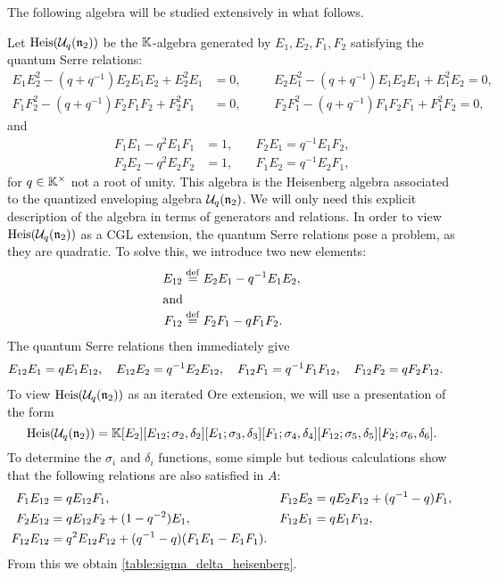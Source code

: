 The following algebra will be studied extensively in what follows.
\begin{example}\label{exmp:heisenberg}
	Let $\operatorname{Heis}(\mathcal{U}_q(\mathfrak{n}_2))$ be the $\mathbb{K}$-algebra generated by $E_1, E_2, F_1, F_2$ satisfying the quantum Serre relations:
	\begin{align*}
		E_1 E_2^2 - (q + q^{-1}) E_2 E_1 E_2 + E_2^2 E_1 & = 0,\quad &  & E_2 E_1^2 - (q + q^{-1}) E_1 E_2 E_1 + E_1^2 E_2 = 0, \\
		F_1 F_2^2 - (q + q^{-1}) F_2 F_1 F_2 + F_2^2 F_1 & = 0,\quad &  & F_2 F_1^2 - (q + q^{-1}) F_1 F_2 F_1 + F_1^2 F_2 = 0,
	\end{align*}
	and
	\begin{align*}
		F_1 E_1 - q^2 E_1 F_1 & = 1, \quad & F_2 E_1 = q^{-1}E_1 F_2, \\
		F_2 E_2 - q^2 E_2 F_2 & = 1, \quad & F_1 E_2 = q^{-1}E_2 F_1,
	\end{align*}
	for $q \in \mathbb{K}^\times$ not a root of unity. This algebra is the Heisenberg algebra
	associated to the quantized enveloping algebra $\mathcal{U}_q(\mathfrak{n}_2)$. We will only
	need this explicit description of the algebra in terms of generators and relations. In
	order to view $\operatorname{Heis}(\mathcal{U}_q(\mathfrak{n}_2))$ as a CGL extension, the quantum Serre relations pose a
	problem, as they are quadratic. To solve this, we introduce two new elements:
	\begin{align*}
		E_{12} & \overset{\mathrm{def}}{=} E_2 E_1 - q^{-1}E_1 E_2, \\
		\shortintertext{and}
		F_{12} & \overset{\mathrm{def}}{=} F_2 F_1 - qF_1 F_2.
	\end{align*}
	The quantum Serre relations then immediately give
	\begin{align*}
		E_{12}E_1 & = q E_1 E_{12}, \quad E_{12}E_2 = q^{-1} E_2 E_{12}, \quad F_{12}F_1 = q^{-1} F_1 F_{12}, \quad F_{12}F_2 = q F_2 F_{12}.
	\end{align*}
	To view $\operatorname{Heis}(\mathcal{U}_q(\mathfrak{n}_2))$ as an iterated Ore extension, we will use a
	presentation of the form
	\begin{equation}\label{eq:cgl_heisenberg}
		\operatorname{Heis}(\mathcal{U}_q(\mathfrak{n}_2)) = \mathbb{K}[E_2][E_{12}; \sigma_2, \delta_2][E_1;\sigma_3, \delta_3][F_1; \sigma_4, \delta_4][F_{12}; \sigma_5, \delta_5][F_2; \sigma_6, \delta_6].
	\end{equation}
	To determine the $\sigma_i$ and $\delta_i$ functions, some simple but tedious
	calculations show that the following relations are also satisfied in $A$:
	\begin{align*}
		F_1 E_{12}   & = q E_{12} F_1,                                        &  & F_{12}E_2 = q E_2 F_{12} + (q^{-1} - q) F_1, \\
		F_2 E_{12}   & = q E_{12}F_2 + (1 -q^{-2})E_1,                        &  & F_{12}E_1 = q E_1 F_{12},                   \\
		F_{12}E_{12} & = q^2 E_{12} F_{12} + (q^{-1} - q) (F_1 E_1 - E_1 F_1).
	\end{align*}
	From this we obtain \cref{table:sigma_delta_heisenberg}.
	\begin{table}
		\begin{center}


\end{center}
\end{table}
\end{example}

